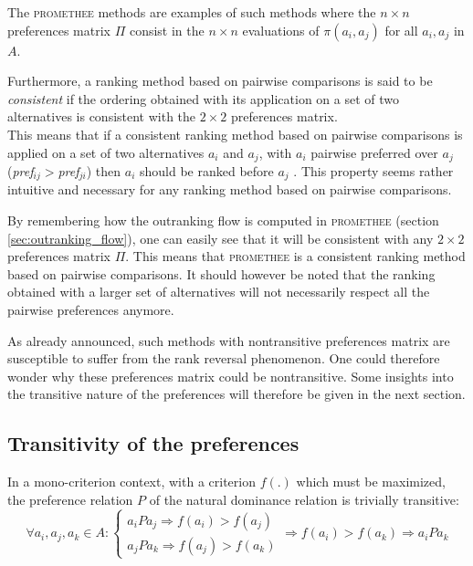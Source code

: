 The \textsc{promethee} methods are examples of such methods where the $n \times n$ preferences matrix $\Pi$ consist in the $n \times n$ evaluations of $\pi(a_i, a_j)$ for all $a_i, a_j$ in $A$.

Furthermore, a ranking method based on pairwise comparisons is said to be \textit{consistent} if the ordering obtained with its application on a set of two alternatives is consistent with the $2 \times 2$ preferences matrix.\\
This means that if a consistent ranking method based on pairwise comparisons is applied on a set of two alternatives $a_i$ and $a_j$, with $a_i$ pairwise preferred over $a_j$ (\textit{pref}$_{ij} > $\textit{pref}$_{ji}$) then $a_i$ should be ranked before $a_j$ \cite{mareschal2008rank}.
This property seems rather intuitive and necessary for any ranking method based on pairwise comparisons.

By remembering how the outranking flow is computed in \textsc{promethee} (section \ref{sec:outranking_flow}), one can easily see that it will be consistent with any $2\times 2$ preferences matrix $\Pi$. 
This means that \textsc{promethee} is a consistent ranking method based on pairwise comparisons.
It should however be noted that the ranking obtained with a larger set of alternatives will not necessarily respect all the pairwise preferences anymore. 

As already announced, such methods with nontransitive preferences matrix are susceptible to suffer from the rank reversal phenomenon.
One could therefore wonder why these preferences matrix could be nontransitive.
Some insights into the transitive nature of the preferences will therefore be given in the next section.
%

\subsection{Transitivity of the preferences}
In a mono-criterion context, with a criterion $f(.)$ which must be maximized, the preference relation $P$ of the natural dominance relation is trivially transitive:
\begin{equation}
    \forall a_i, a_j, a_k \in A: \left \{
        \begin{array}{l}
            a_iPa_j \Rightarrow f(a_i) > f(a_j) \\
            a_jPa_k \Rightarrow f(a_j) > f(a_k)
        \end{array} \right .
        \Rightarrow f(a_i) > f(a_k) \Rightarrow a_iPa_k
    \label{eqn:transitivity_preference_monocriterion}
\end{equation}

